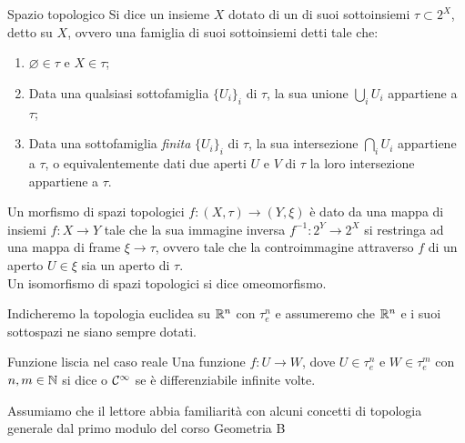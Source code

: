 \documentclass[openany]{book}
\renewcommand\C{\mc{C}}
\begin{document}
\begin{definition}{Spazio topologico}{}
    Si dice  un insieme $X$ dotato di un  di suoi sottoinsiemi $\tau\subset 2^X$, detto  su $X$, ovvero una famiglia di suoi sottoinsiemi detti  tale che:\begin{enumerate}
        \item $\varnothing \in \tau$ e $X\in \tau$;
        \item Data una qualsiasi sottofamiglia $\{U_i\}_i$ di $\tau$, la sua unione $\bigcup_i U_i$ appartiene a $\tau$;
        \item Data una sottofamiglia \textit{finita} $\{U_i\}_i$ di $\tau$, la sua intersezione $\bigcap_i U_i$ appartiene a $\tau$, o equivalentemente dati due aperti $U$ e $V$ di $\tau$ la loro intersezione appartiene a $\tau$.
    \end{enumerate}
    Un morfismo di spazi topologici $f: (X,\tau)\to(Y,\xi)$ è dato da una mappa di insiemi $f:X\to Y$ tale che la sua immagine inversa $f^{-1}: 2^Y \to 2^X$ si restringa ad una mappa di frame $\xi\to\tau$, ovvero tale che la controimmagine attraverso $f$ di un aperto $U \in \xi$ sia un aperto di $\tau$.\\
    Un isomorfismo di spazi topologici si dice omeomorfismo.
\end{definition}

Indicheremo la topologia euclidea su $\mathbb{R}^n$ con $\tau_e^n$ e assumeremo che $\mathbb{R}^n$ e i suoi sottospazi ne siano sempre dotati.

\begin{definition}{Funzione liscia nel caso reale}{}
    Una funzione $f: U\to W$, dove $U\in \tau_e^n$ e $W \in \tau_e^m$ con $n,m \in \mathbb{N}$ si dice  o $\C^\infty$ se è differenziabile infinite volte.
\end{definition}

Assumiamo che il lettore abbia familiarità con alcuni concetti di topologia generale dal primo modulo del corso Geometria B
\end{document}
